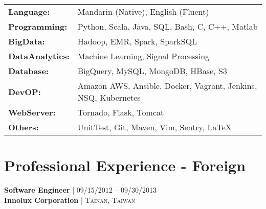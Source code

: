 \documentclass[10pt]{article} %
\begin{document}
{\begin{minipage}[t]{0.47\textwidth}
\begin{tabular}{ l p{6cm}}
  \textbf{Language:} & Mandarin (Native), English (Fluent)\\
  \textbf{Programming:} & Python, Scala, Java, SQL, Bash, C, C++, Matlab\\
  \textbf{BigData:} & Hadoop, EMR, Spark, SparkSQL\\
  \textbf{DataAnalytics:} & Machine Learning, Signal Processing\\
  \textbf{Database:} & BigQuery, MySQL, MongoDB, HBase, S3\\
  \textbf{DevOP:} & Amazon AWS, Ansible, Docker, Vagrant, Jenkins, NSQ, Kubernetes\\
  \textbf{WebServer:} & Tornado, Flask, Tomcat\\
  \textbf{Others:} & UnitTest, Git, Maven, Vim, Sentry, \LaTeX
\end{tabular}





\section{Professional Experience - Foreign} 


{\raggedright\normalsize
\textbf{Software Engineer} {\hfill\footnotesize\textsc{| 09/15/2012 -- 09/30/2013}} \\ 
\textbf{Innolux Corporation} {\hfill\footnotesize\textsc{| Tainan, Taiwan}}}


\end{minipage}}
\end{document}
